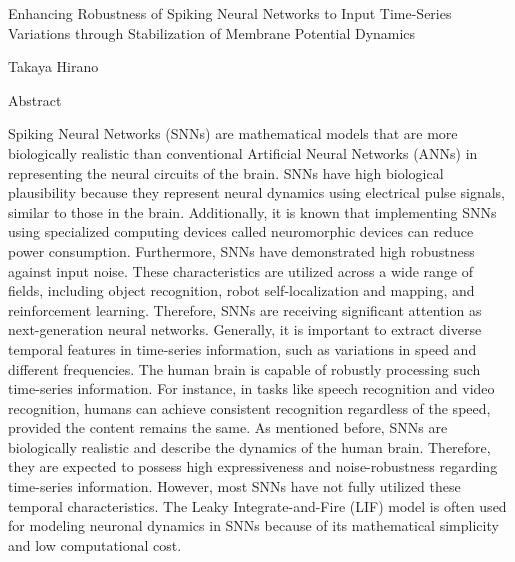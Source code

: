 \pagestyle{empty}

\begin{center}
    Enhancing Robustness of Spiking Neural Networks to Input Time-Series Variations through Stabilization of Membrane Potential Dynamics
\end{center}
\vspace{10mm}
\begin{center}
    Takaya Hirano
\end{center}
\vspace{10mm}

\begin{center}
    Abstract
\end{center}
\vspace{10mm}

Spiking Neural Networks (SNNs) are mathematical models that are more biologically realistic than conventional Artificial Neural Networks (ANNs) in representing the neural circuits of the brain.
SNNs have high biological plausibility because they represent neural dynamics using electrical pulse signals, similar to those in the brain.
Additionally, it is known that implementing SNNs using specialized computing devices called neuromorphic devices can reduce power consumption. 
Furthermore, SNNs have demonstrated high robustness against input noise.
These characteristics are utilized across a wide range of fields, including object recognition, robot self-localization and mapping, and reinforcement learning.
Therefore, SNNs are receiving significant attention as next-generation neural networks.
Generally, it is important to extract diverse temporal features in time-series information, such as variations in speed and different frequencies. 
The human brain is capable of robustly processing such time-series information.
For instance, in tasks like speech recognition and video recognition, humans can achieve consistent recognition regardless of the speed, provided the content remains the same.
As mentioned before, SNNs are biologically realistic and describe the dynamics of the human brain.
Therefore, they are expected to possess high expressiveness and noise-robustness regarding time-series information.
However, most SNNs have not fully utilized these temporal characteristics. 
The Leaky Integrate-and-Fire (LIF) model is often used for modeling neuronal dynamics in SNNs because of its mathematical simplicity and low computational cost. 
